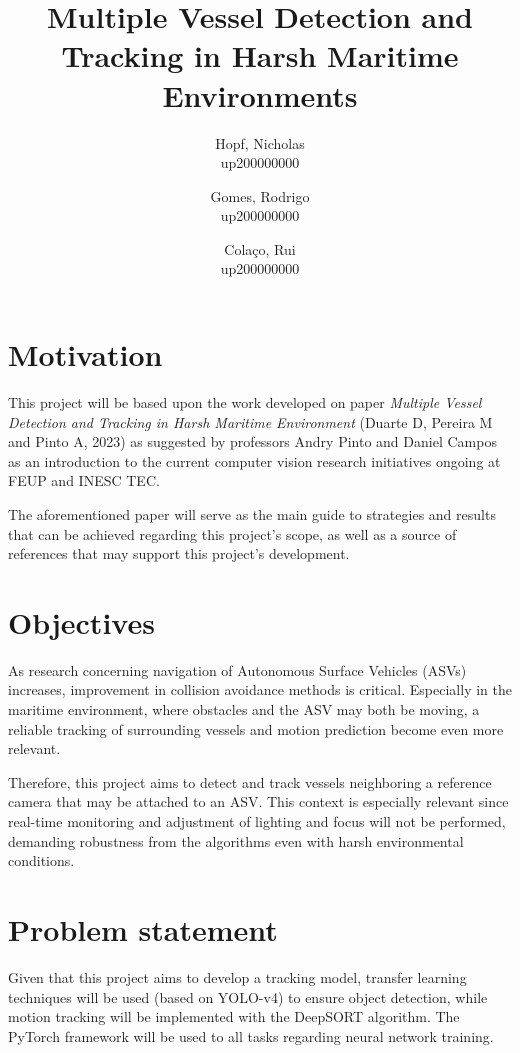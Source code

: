 \documentclass[a4paper,12pt]{article}
\title{
\textbf{Multiple Vessel Detection and Tracking in Harsh Maritime Environments}
}
\author{
    Hopf, Nicholas\\
    up200000000
    \and
    Gomes, Rodrigo\\
    up200000000
    \and
    Colaço, Rui\\
    up200000000
}
\date{\vspace{-3ex}}
\begin{document}
\maketitle

\section{Motivation}

This project will be based upon the work developed on paper \textit{Multiple Vessel Detection and Tracking in Harsh Maritime Environment} (Duarte D, Pereira M and Pinto A, 2023) as suggested by professors Andry Pinto and Daniel Campos as an introduction to the current computer vision research initiatives ongoing at FEUP and INESC TEC.
\\\par
The aforementioned paper will serve as the main guide to strategies and results that can be achieved regarding this project's scope, as well as a source of references that may support this project's development.

\section{Objectives}
As research concerning navigation of Autonomous Surface Vehicles (ASVs) increases, improvement in collision avoidance methods is critical. Especially in the maritime environment, where obstacles and the ASV may both be moving, a reliable tracking of surrounding vessels and motion prediction become even more relevant.
\\\par
Therefore, this project aims to detect and track vessels neighboring a reference camera that may be attached to an ASV. This context is especially relevant since real-time monitoring and adjustment of lighting and focus will not be performed, demanding robustness from the algorithms even with harsh environmental conditions.

\section{Problem statement}
Given that this project aims to develop a tracking model, transfer learning techniques will be used (based on YOLO-v4) to ensure object detection, while motion tracking will be implemented with the DeepSORT algorithm. The PyTorch framework will be used to all tasks regarding neural network training.
\end{document}
